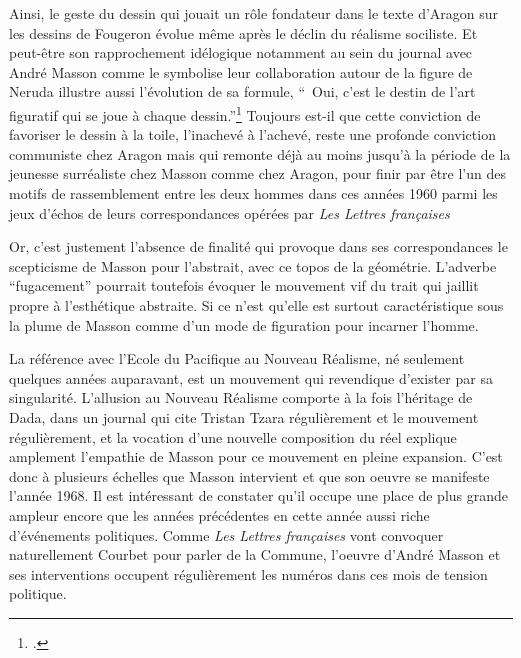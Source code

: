 	\begin{quote}
		
	\end{quote}



Ainsi, le geste du dessin qui jouait un rôle fondateur dans le texte d'Aragon sur les dessins de Fougeron évolue même après le déclin du réalisme sociliste. Et peut-être son rapprochement idélogique notamment au sein du journal avec André Masson comme le symbolise leur collaboration autour de la figure de Neruda illustre aussi l'évolution de sa formule, \enquote{ Oui, c’est le destin de l’art figuratif qui se joue à chaque dessin.}\footcite[p135]{ecritssurla} Toujours est-il que cette conviction de favoriser le dessin à la toile, l'inachevé à l'achevé, reste une profonde conviction communiste chez Aragon mais qui remonte déjà au moins jusqu'à la période de la jeunesse surréaliste chez Masson comme chez Aragon, pour finir par être l'un des motifs de rassemblement entre les deux hommes dans ces années 1960 parmi les jeux d'échos de leurs correspondances opérées par \emph{Les Lettres françaises}

	Or, c’est justement l’absence de finalité qui provoque dans ses correspondances le scepticisme de Masson pour l’abstrait, avec ce topos  de la géométrie. L’adverbe \enquote{fugacement} pourrait toutefois évoquer le mouvement vif du trait qui jaillit propre à l’esthétique abstraite. Si ce n’est qu’elle est surtout caractéristique sous la plume de Masson comme d’un mode de figuration pour incarner l’homme. 

	La référence avec l’Ecole du Pacifique au Nouveau Réalisme, né seulement quelques années auparavant, est un mouvement qui revendique d’exister par sa singularité. L’allusion au Nouveau Réalisme comporte à la fois l’héritage de Dada, dans un journal qui cite Tristan Tzara régulièrement et le mouvement régulièrement, et la vocation d’une nouvelle composition du réel explique amplement l’empathie de Masson pour ce mouvement en pleine expansion. C’est donc à plusieurs échelles que Masson intervient et que son oeuvre se manifeste l’année 1968. Il est intéressant de constater qu’il occupe une place de plus grande ampleur encore que les années précédentes en cette année aussi riche d’événements politiques. Comme \emph{Les Lettres françaises} vont convoquer naturellement Courbet pour parler de la Commune, l’oeuvre d’André Masson et ses interventions occupent régulièrement les numéros dans ces mois de tension politique. 

